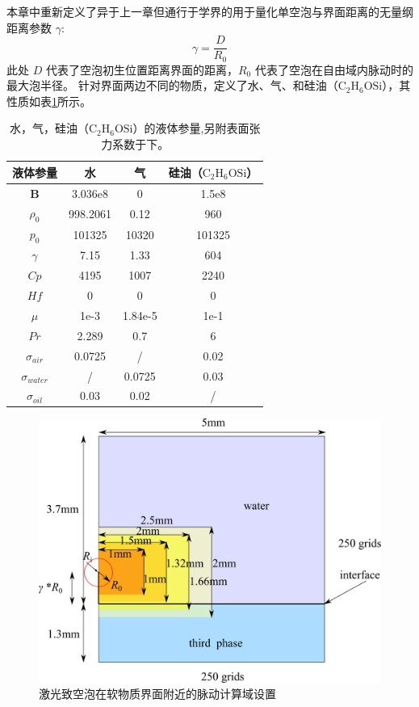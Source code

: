 本章中重新定义了异于上一章但通行于学界的用于量化单空泡与界面距离的无量纲距离参数 $\gamma$:
$$\gamma=\frac {D} {R_\mathrm{0}}
$$
此处 $D$ 代表了空泡初生位置距离界面的距离，$R_\mathrm{0}$ 代表了空泡在自由域内脉动时的最大泡半径。
针对界面两边不同的物质，定义了水、气、和硅油（$\mathrm{C_2H_6OSi}$），其性质如表\ref{tab:3.1}所示。

\begin{table}[h]
    \centering
    \begin{tabular}{|c|c|c|c|}
    \hline
    \textbf{液体参量} &  \textbf{水} &  \textbf{气} &  \textbf{硅油（$\mathrm{C_2H_6OSi}$）}   \\  \hline
    \textbf{B} & 3.036e8&0 &1.5e8 \\  \hline
    \textbf{$\rho_0$} & 998.2061&0.12 &960 \\  \hline
    \textbf{$p_0$} &  101325&10320 &101325 \\  \hline
    \textbf{$\gamma$} &  7.15&1.33 &604 \\  \hline
    \textbf{$Cp$} & 4195 & 1007&2240 \\  \hline
    \textbf{$Hf$} &  0&0 &0 \\  \hline
    \textbf{$\mu$} & 1e-3& 1.84e-5&1e-1 \\  \hline
    \textbf{$Pr$} & 2.289& 0.7&6  \\  \hline

    \textbf{$\sigma_{air}$} & 0.0725& /&0.02  \\  \hline
        \textbf{$\sigma_{water}$} & /& 0.0725&0.03  \\  \hline
            \textbf{$\sigma_{oil}$} & 0.03& 0.02&  / \\  \hline
    
    \end{tabular}
    \caption[水，气，硅油（$\mathrm{C_2H_6OSi}$）的液体参量]{水，气，硅油（$\mathrm{C_2H_6OSi}$）的液体参量,另附表面张力系数于下。}
    \label{tab:3.1}
\end{table}

\begin{figure}[h]
    \centering
    \includegraphics[width=0.7\linewidth]{img/interface.pdf}
    \caption{激光致空泡在软物质界面附近的脉动计算域设置}
    \label{fig:interface}
\end{figure}

